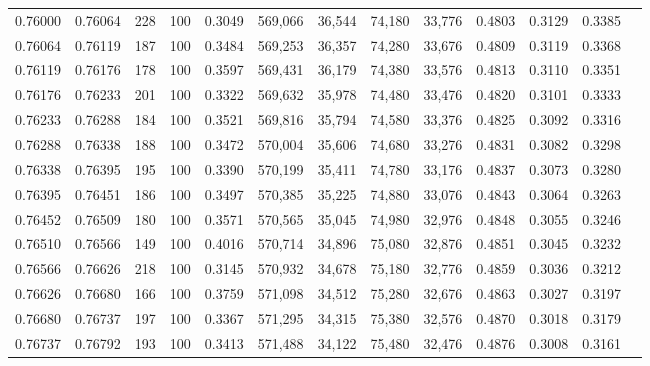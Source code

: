 \begin{tabular}{rrrrrrrrrrrrr}
0.76000 & 0.76064 &   228 & 100 &                                     0.3049 & 569,066 &  36,544 &  74,180 &  33,776 & 0.4803 & 0.3129 & 0.3385 \\
0.76064 & 0.76119 &   187 & 100 &                                     0.3484 & 569,253 &  36,357 &  74,280 &  33,676 & 0.4809 & 0.3119 & 0.3368 \\
0.76119 & 0.76176 &   178 & 100 &                                     0.3597 & 569,431 &  36,179 &  74,380 &  33,576 & 0.4813 & 0.3110 & 0.3351 \\
0.76176 & 0.76233 &   201 & 100 &                                     0.3322 & 569,632 &  35,978 &  74,480 &  33,476 & 0.4820 & 0.3101 & 0.3333 \\
0.76233 & 0.76288 &   184 & 100 &                                     0.3521 & 569,816 &  35,794 &  74,580 &  33,376 & 0.4825 & 0.3092 & 0.3316 \\
0.76288 & 0.76338 &   188 & 100 &                                     0.3472 & 570,004 &  35,606 &  74,680 &  33,276 & 0.4831 & 0.3082 & 0.3298 \\
0.76338 & 0.76395 &   195 & 100 &                                     0.3390 & 570,199 &  35,411 &  74,780 &  33,176 & 0.4837 & 0.3073 & 0.3280 \\
0.76395 & 0.76451 &   186 & 100 &                                     0.3497 & 570,385 &  35,225 &  74,880 &  33,076 & 0.4843 & 0.3064 & 0.3263 \\
0.76452 & 0.76509 &   180 & 100 &                                     0.3571 & 570,565 &  35,045 &  74,980 &  32,976 & 0.4848 & 0.3055 & 0.3246 \\
0.76510 & 0.76566 &   149 & 100 &                                     0.4016 & 570,714 &  34,896 &  75,080 &  32,876 & 0.4851 & 0.3045 & 0.3232 \\
0.76566 & 0.76626 &   218 & 100 &                                     0.3145 & 570,932 &  34,678 &  75,180 &  32,776 & 0.4859 & 0.3036 & 0.3212 \\
0.76626 & 0.76680 &   166 & 100 &                                     0.3759 & 571,098 &  34,512 &  75,280 &  32,676 & 0.4863 & 0.3027 & 0.3197 \\
0.76680 & 0.76737 &   197 & 100 &                                     0.3367 & 571,295 &  34,315 &  75,380 &  32,576 & 0.4870 & 0.3018 & 0.3179 \\
0.76737 & 0.76792 &   193 & 100 &                                     0.3413 & 571,488 &  34,122 &  75,480 &  32,476 & 0.4876 & 0.3008 & 0.3161 \\

\end{tabular}
